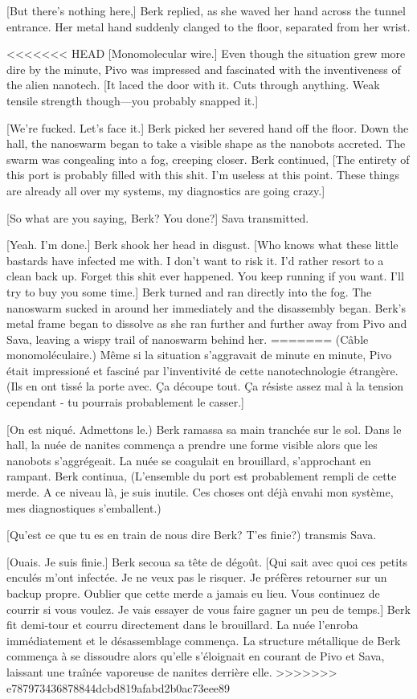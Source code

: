 [But there's nothing here,] Berk replied, as she waved her hand across the tunnel entrance. Her metal hand suddenly clanged to the floor, separated from her wrist. 

<<<<<<< HEAD
[Monomolecular wire.] Even though the situation grew more dire by the minute, Pivo was impressed and fascinated with the inventiveness of the alien nanotech. [It laced the door with it. Cuts through anything. Weak tensile strength though—you probably snapped it.] 

[We're fucked. Let's face it.] Berk picked her severed hand off the floor. Down the hall, the nanoswarm began to take a visible shape as the nanobots accreted. The swarm was congealing into a fog, creeping closer. Berk continued, [The entirety of this port is probably filled with this shit. I'm useless at this point. These things are already all over my systems, my diagnostics are going crazy.] 

[So what are you saying, Berk? You done?] Sava transmitted. 

[Yeah. I'm done.] Berk shook her head in disgust. [Who knows what these little bastards have infected me with. I don't want to risk it. I'd rather resort to a clean back up. Forget this shit ever happened. You keep running if you want. I'll try to buy you some time.] Berk turned and ran directly into the fog. The nanoswarm sucked in around her immediately and the disassembly began. Berk's metal frame began to dissolve as she ran further and further away from Pivo and Sava, leaving a wispy trail of nanoswarm behind her. 
=======
(Câble monomoléculaire.) Même si la situation s'aggravait de minute en minute, Pivo était impressioné et fasciné par l'inventivité de cette nanotechnologie étrangère. (Ils en ont tissé la porte avec. Ça découpe tout. Ça résiste assez mal à la tension cependant - tu pourrais probablement le casser.] 

[On est niqué. Admettons le.) Berk ramassa sa main tranchée sur le sol. Dans le hall, la nuée de nanites commença a prendre une forme visible alors que les nanobots s'aggrégeait. La nuée se coagulait en brouillard, s'approchant en rampant. Berk continua, (L'ensemble du port est probablement rempli de cette merde. A ce niveau là, je suis inutile. Ces choses ont déjà envahi mon système, mes diagnostiques s'emballent.) 

[Qu'est ce que tu es en train de nous dire Berk? T'es finie?) transmis Sava. 

[Ouais. Je suis finie.] Berk secoua sa tête de dégoût. [Qui sait avec quoi ces petits enculés  m'ont infectée. Je ne veux pas le risquer. Je préfères retourner sur un backup propre. Oublier que cette merde a jamais eu lieu. Vous continuez de courrir si vous voulez. Je vais essayer de vous faire gagner un peu de temps.] Berk fit demi-tour et courru directement dans le brouillard. La nuée l'enroba immédiatement et le désassemblage commença. La structure métallique de Berk commença à se dissoudre alors qu'elle s'éloignait en courant de Pivo et Sava, laissant une traînée vaporeuse de nanites derrière elle. 
>>>>>>> e787973436878844dcbd819afabd2b0ac73eee89

